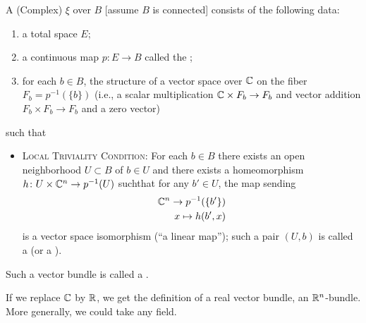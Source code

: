 \begin{definition}
A (Complex)  $\xi$ over $B$ [assume $B$ is connected]
consists of the following data:
\begin{enumerate}
\item a total space $E$;
\item a continuous map $p\colon E\to B$ called the ;
\item for each $b\in B$, the structure of a vector space over $\mathbb{C}$ on
  the fiber $F_{b}=p^{-1}(\{b\})$ (i.e., a scalar multiplication
  $\mathbb{C}\times F_{b}\to F_{b}$ and vector addition $F_{b}\times F_{b}\to F_{b}$
  and a zero vector)
\end{enumerate}
such that
\begin{itemize}
\item\textsc{Local Triviality Condition}: For each $b\in B$ there
  exists an open neighborhood $U\subset B$ of $b\in U$ and there
  exists a homeomorphism $h\colon U\times\mathbb{C}^{n}\to p^{-1}(U)$
  suchthat for any $b'\in U$, the map sending
\begin{equation}
\begin{split}
\mathbb{C}^{n}\to p^{-1}(\{b'\})\\
x\mapsto h(b',x)
\end{split}
\end{equation}
is a vector space isomorphism (``a linear map''); such a pair $(U,b)$
is called a  (or a ).
\end{itemize}
Such a vector bundle is called a .
\end{definition}

\begin{remark}
If we replace $\mathbb{C}$ by $\mathbb{R}$, we get the definition of a real vector
bundle, an $\mathbb{R}^{n}$-bundle. More generally, we could take any field.
\end{remark}

